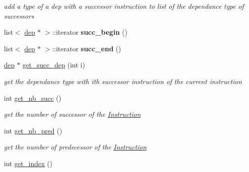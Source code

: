 \begin{DoxyCompactItemize}
\begin{DoxyCompactList}\small\item\em add a type of a dep with a successor instruction to list of the dependance type of successors \end{DoxyCompactList}\item 
\hypertarget{classInstruction_a2c6f13ddda889e4e2b8b69897de6b733}{list$<$ \hyperlink{structdep}{dep} $\ast$ $>$\-::iterator {\bfseries succ\-\_\-begin} ()}\label{classInstruction_a2c6f13ddda889e4e2b8b69897de6b733}

\item 
\hypertarget{classInstruction_a0800ca0afbbc783b57170d981d406fb6}{list$<$ \hyperlink{structdep}{dep} $\ast$ $>$\-::iterator {\bfseries succ\-\_\-end} ()}\label{classInstruction_a0800ca0afbbc783b57170d981d406fb6}

\item 
\hypertarget{classInstruction_ad3bb47ea5f9e4b975e0191d6c96ffc30}{\hyperlink{structdep}{dep} $\ast$ \hyperlink{classInstruction_ad3bb47ea5f9e4b975e0191d6c96ffc30}{get\-\_\-succ\-\_\-dep} (int i)}\label{classInstruction_ad3bb47ea5f9e4b975e0191d6c96ffc30}

\begin{DoxyCompactList}\small\item\em get the dependance type with ith successor instruction of the current instruction \end{DoxyCompactList}\item 
\hypertarget{classInstruction_ab2d8c29efa78ec3c1a70f154a8c2f068}{int \hyperlink{classInstruction_ab2d8c29efa78ec3c1a70f154a8c2f068}{get\-\_\-nb\-\_\-succ} ()}\label{classInstruction_ab2d8c29efa78ec3c1a70f154a8c2f068}

\begin{DoxyCompactList}\small\item\em get the number of successor of the \hyperlink{classInstruction}{\-Instruction} \end{DoxyCompactList}\item 
\hypertarget{classInstruction_a9e56e8e2c857abc409f27af9f80f9595}{int \hyperlink{classInstruction_a9e56e8e2c857abc409f27af9f80f9595}{get\-\_\-nb\-\_\-pred} ()}\label{classInstruction_a9e56e8e2c857abc409f27af9f80f9595}

\begin{DoxyCompactList}\small\item\em get the number of predecessor of the \hyperlink{classInstruction}{\-Instruction} \end{DoxyCompactList}\item 
\hypertarget{classInstruction_a14c5f91c242a5b58eda9f123ad331cbe}{int \hyperlink{classInstruction_a14c5f91c242a5b58eda9f123ad331cbe}{get\-\_\-index} ()}\label{classInstruction_a14c5f91c242a5b58eda9f123ad331cbe}


\end{DoxyCompactItemize}
